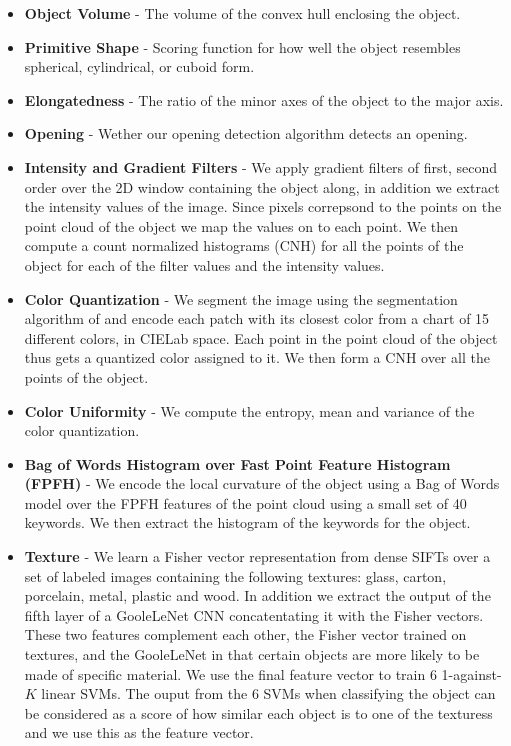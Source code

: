 \begin{itemize}
\tightlist
\item
  \textbf{Object Volume} - The volume of the convex hull enclosing the
  object.
\item
  \textbf{Primitive Shape} - Scoring function for how well the object
  resembles spherical, cylindrical, or cuboid form.
\item
  \textbf{Elongatedness} - The ratio of the minor axes of the object to
  the major axis.
\item
  \textbf{Opening} - Wether our opening detection algorithm detects an
  opening.
\item
  \textbf{Intensity and Gradient Filters} - We apply gradient filters of
  first, second order over the 2D window containing the object along, in
  addition we extract the intensity values of the image. Since pixels
  correpsond to the points on the point cloud of the object we map the
  values on to each point. We then compute a count normalized histograms
  (CNH) for all the points of the object for each of the filter values
  and the intensity values.
\item
  \textbf{Color Quantization} - We segment the image using the
  segmentation algorithm of \cite{Felzenszwalb:2004vi} and encode each
  patch with its closest color from a chart of 15 different colors, in
  CIELab space. Each point in the point cloud of the object thus gets a
  quantized color assigned to it. We then form a CNH over all the points
  of the object.\\
\item
  \textbf{Color Uniformity} - We compute the entropy, mean and variance
  of the color quantization.
\item
  \textbf{Bag of Words Histogram over Fast Point Feature Histogram
  (FPFH)} \cite{Rusu:2009hf} - We encode the local curvature of the
  object using a Bag of Words model over the FPFH features of the point
  cloud using a small set of 40 keywords. We then extract the histogram
  of the keywords for the object.
\item
  \textbf{Texture} - We learn a Fisher vector representation from dense
  SIFTs over a set of labeled images containing the following textures:
  glass, carton, porcelain, metal, plastic and wood. In addition we
  extract the output of the fifth layer of a GooleLeNet CNN
  concatentating it with the Fisher vectors. These two features
  complement each other, the Fisher vector trained on textures, and the
  GooleLeNet in that certain objects are more likely to be made of
  specific material. We use the final feature vector to train 6
  1-against-\(K\) linear SVMs. The ouput from the 6 SVMs when
  classifying the object can be considered as a score of how similar
  each object is to one of the texturess and we use this as the feature
  vector.
\end{itemize}
